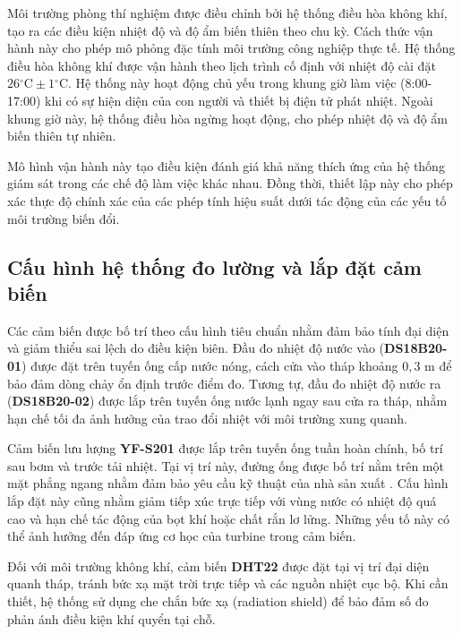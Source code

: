 \documentclass[../main.tex]{subfiles}
\begin{document}
Môi trường phòng thí nghiệm được điều chỉnh bởi hệ thống điều hòa không khí, tạo ra các điều kiện nhiệt độ và độ ẩm biến thiên theo chu kỳ. Cách thức vận hành này cho phép mô phỏng đặc tính môi trường công nghiệp thực tế. Hệ thống điều hòa không khí được vận hành theo lịch trình cố định với nhiệt độ cài đặt $26{^\circ\mathrm{C}} \pm 1{^\circ\mathrm{C}}$. Hệ thống này hoạt động chủ yếu trong khung giờ làm việc (8:00-17:00) khi có sự hiện diện của con người và thiết bị điện tử phát nhiệt. Ngoài khung giờ này, hệ thống điều hòa ngừng hoạt động, cho phép nhiệt độ và độ ẩm biến thiên tự nhiên.

Mô hình vận hành này tạo điều kiện đánh giá khả năng thích ứng của hệ thống giám sát trong các chế độ làm việc khác nhau. Đồng thời, thiết lập này cho phép xác thực độ chính xác của các phép tính hiệu suất dưới tác động của các yếu tố môi trường biến đổi.

\subsection{Cấu hình hệ thống đo lường và lắp đặt cảm biến}
\label{sec:measurement_system_config}

Các cảm biến được bố trí theo cấu hình tiêu chuẩn nhằm đảm bảo tính đại diện và giảm thiểu sai lệch do điều kiện biên. Đầu đo nhiệt độ nước vào (\textbf{DS18B20-01}) được đặt trên tuyến ống cấp nước nóng, cách cửa vào tháp khoảng $0{,}3$ m để bảo đảm dòng chảy ổn định trước điểm đo. Tương tự, đầu đo nhiệt độ nước ra (\textbf{DS18B20-02}) được lắp trên tuyến ống nước lạnh ngay sau cửa ra tháp, nhằm hạn chế tối đa ảnh hưởng của trao đổi nhiệt với môi trường xung quanh.

Cảm biến lưu lượng \textbf{YF-S201} được lắp trên tuyến ống tuần hoàn chính, bố trí sau bơm và trước tải nhiệt. Tại vị trí này, đường ống được bố trí nằm trên một mặt phẳng ngang nhằm đảm bảo yêu cầu kỹ thuật của nhà sản xuất \cite{datasheet_YFS201}. Cấu hình lắp đặt này cũng nhằm giảm tiếp xúc trực tiếp với vùng nước có nhiệt độ quá cao và hạn chế tác động của bọt khí hoặc chất rắn lơ lửng. Những yếu tố này có thể ảnh hưởng đến đáp ứng cơ học của turbine trong cảm biến.

Đối với môi trường không khí, cảm biến \textbf{DHT22} được đặt tại vị trí đại diện quanh tháp, tránh bức xạ mặt trời trực tiếp và các nguồn nhiệt cục bộ. Khi cần thiết, hệ thống sử dụng che chắn bức xạ (radiation shield) để bảo đảm số đo phản ánh điều kiện khí quyển tại chỗ.
\end{document}
